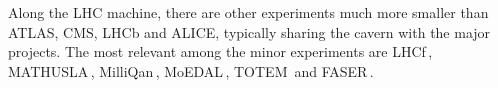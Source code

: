 Along the LHC machine, there are other experiments much more smaller than ATLAS, CMS, LHCb and ALICE, typically sharing the cavern with the major projects. 
The most relevant among the minor experiments are LHCf$\,$\cite{LHCf:2008lfy}, MATHUSLA$\,$\cite{MATHUSLA:2018bqv}, MilliQan$\,$\cite{Yoo:2645863}, 
MoEDAL$\,$\cite{Mitsou:2017doz}, TOTEM$\,$\cite{Collaboration_totem_2008} and FASER$\,$\cite{FASER:2018ceo}.
 
\begin{comment}
\begin{itemize}
  \item \textbf{The Large Hadron Collider forward (LHCf)} \cite{LHCf:2008lfy}: Uses particles thrown forward by collisions in the Large Hadron 
  			Collider as a source to simulate cosmic rays in laboratory conditions. It shares its cavern with the ATLAS detector \cite{Adriani:926196}.
  \item  \textbf{The Massive Timing Hodoscope for Ultra Stable neutraL pArticles (MATHUSLA)} \cite{MATHUSLA:2018bqv}: Is dedicated large-volume 
  			displaced vertex detector for the HL-LHC on the surface above ATLAS or CMS for the search for neutral long-lived particles.
  \item  \textbf{MilliQan} \cite{Yoo:2645863}\cite{PhysRevD.102.032002}: Consists on a small-scale detector experiment aiming to detect millicharged particles, i.e., particles with charges 
  			much smaller than that of the electron.
  \item \textbf{Monopole and exotic particle detector at the LHC (MoEDAL)} \cite{Mitsou:2017doz}: Deployed at LHCb cavern, it is optimised to detect 
  			highly ionising particles such as magnetic monopoles, dyons and multiple-electrically charged stable massive particles predicted in a number 
			of theoretical scenarios. %
  \item \textbf{TOTEM} \cite{Collaboration_totem_2008}:  Aims to measure the total cross-section of $\Pproton \Pproton$ interaction using a luminosity-independent method 
  			and study elastic and diffractive scattering at the LHC. As CERN longest experiment, TOTEM detectors are spread across almost half a kilometre 
			around the CMS interaction point.
  \item \textbf{ForwArd Search ExpeRiment (FASER)}  \cite{FASER:2018bac}\cite{FASER:2018ceo}: Designed to search for new, yet undiscovered, light and 
  			weakly-interacting particles and study the interactions of high-energy neutrinos.
\end{itemize}
\end{comment}

